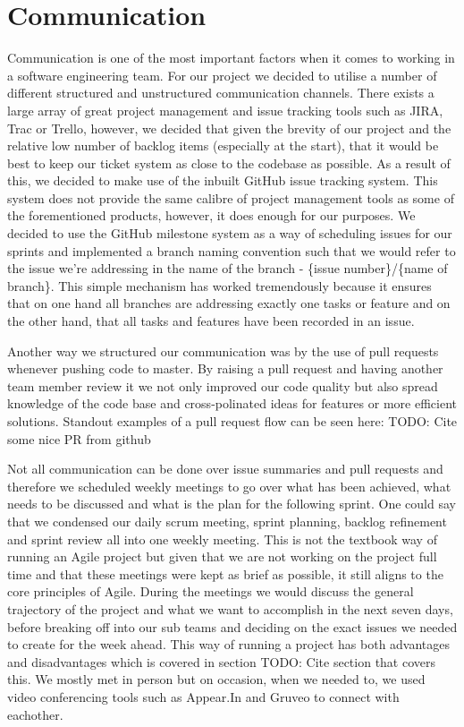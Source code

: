 \documentclass[a4paper]{report}
\begin{document}
	
	\section{Communication}
	
	Communication is one of the most important factors when it comes to working in a software engineering team. For our project we decided to utilise a number of different structured and unstructured communication channels. There exists a large array of great project management and issue tracking tools such as JIRA, Trac or Trello, however, we decided that given the brevity of our project and the relative low number of backlog items (especially at the start), that it would be best to keep our ticket system as close to the codebase as possible. As a result of this, we decided to make use of the inbuilt GitHub issue tracking system. This system does not provide the same calibre of project management tools as some of the forementioned products, however, it does enough for our purposes. We decided to use the GitHub milestone system as a way of scheduling issues for our sprints and implemented a branch naming convention such that we would refer to the issue we're addressing in the name of the branch - \{issue number\}/\{name of branch\}. This simple mechanism has worked tremendously because it ensures that on one hand all branches are addressing exactly one tasks or feature and on the other hand, that all tasks and features have been recorded in an issue. 
	
	Another way we structured our communication was by the use of pull requests whenever pushing code to master. By raising a pull request and having another team member review it we not only improved our code quality but also spread knowledge of the code base and cross-polinated ideas for features or more efficient solutions. Standout examples of a pull request flow can be seen here: TODO: Cite some nice PR from github
	
	Not all communication can be done over issue summaries and pull requests and therefore we scheduled weekly meetings to go over what has been achieved, what needs to be discussed and what is the plan for the following sprint. One could say that we condensed our daily scrum meeting, sprint planning, backlog refinement and sprint review all into one weekly meeting. This is not the textbook way of running an Agile project but given that we are not working on the project full time and that these meetings were kept as brief as possible, it still aligns to the core principles of Agile. During the meetings we would discuss the general trajectory of the project and what we want to accomplish in the next seven days, before breaking off into our sub teams and deciding on the exact issues we needed to create for the week ahead. This way of running a project has both advantages and disadvantages which is covered in section TODO: Cite section that covers this. We mostly met in person but on occasion, when we needed to, we used video conferencing tools such as Appear.In and Gruveo to connect with eachother.
	
\end{document}
